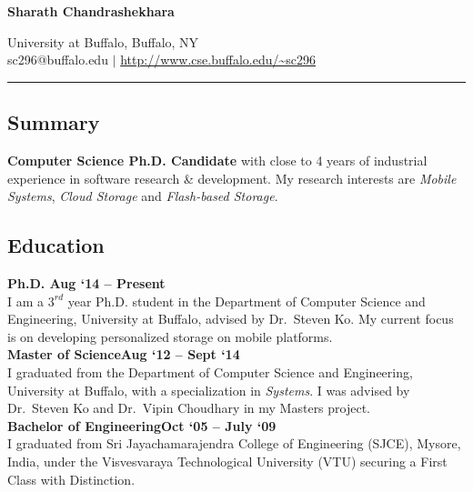 \documentclass[letterpaper, 11pt]{article}
\begin{document}
	
	\begin{center}
		\textbf{\Large Sharath Chandrashekhara}
	\end{center}
	
	\footnotesize
	\begin{center}
		University at Buffalo, Buffalo, NY\\
		sc296@buffalo.edu ${ | }$ \href{
			http://www.cse.buffalo.edu/~sc296}{\url{http://www.cse.buffalo.edu/~sc296}}
		\rule{\textwidth}{0.3mm}
	\end{center}
	
	\normalsize
	
	\subsection{Summary}
	\textbf{Computer Science Ph.D. Candidate} with close to 4 years of
	industrial experience in software research \& development. My research
	interests are \emph{Mobile Systems}, \emph{Cloud Storage} and
	\emph{Flash-based Storage}.
	
	\subsection{Education}
	\textbf{Ph.D. \hfill Aug `14 -- Present}\\
	I am a $3^{rd}$ year Ph.D. student in the Department of Computer Science and
	Engineering,
	University at Buffalo, advised by Dr.~Steven Ko. My current focus is on
	developing personalized storage on mobile platforms.
	\\
	
	\textbf{Master of Science\hfill Aug `12 -- Sept `14}\\
	I graduated from the Department of Computer Science and Engineering,
	University at Buffalo, with a specialization in \emph{Systems}. I was advised by
	Dr.~Steven Ko
	and Dr.~Vipin Choudhary in my Masters project.
	\\
	
	\textbf{Bachelor of Engineering\hfill Oct `05 --
		July `09}\\
	I graduated from Sri Jayachamarajendra College of Engineering (SJCE), Mysore,
	India,
	under the Visvesvaraya Technological University (VTU) securing a
	First Class with Distinction.
	
\end{document}
